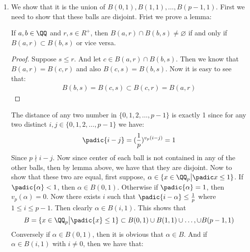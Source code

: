 \begin{enumerate}[label=\ilabel]
        \begin{gather*}
            x = p^r w = p^k p^{r - k} w
        \end{gather*}
        And since $p^{r - k} w \in \ZZ_p$, then $x \in p^k \ZZ_p$. This follows that $I \subseteq p^k \ZZ_p$. Hence $I = p^k \ZZ_p$. And we know that $p^k \ZZ_p$ is describing $B(0, (\frac{1}{p})^k) = \{ x \in \ZZ_p \big| \padic x < (\frac{1}{p})^k \}$. Hence the proof is complete.
    \item
        We show that it is the union of $B(0, 1), B(1, 1), \dots, B(p - 1, 1)$. First we need to show that these balls are disjoint. Frist we prove a lemma:
        \begin{lemma}
            If $a, b \in \QQ$ and $r, s \in R^+$, then $B(a, r) \cap B(b, s) \ne \varnothing$ if and only if $B(a, r) \subset B(b, s)$ or vice versa.
        \end{lemma}
        \begin{proof}
            Suppose $s \le r$. And let $c \in B(a, r) \cap B(b, s)$. Then we know that $B(a, r) = B(c, r)$ and also $B(c, s) = B(b, s)$. Now it is easy to see that:
            \begin{gather*}
                B(b, s) = B(c, s) \subset B(c, r) = B(a, r)
            \end{gather*}
        \end{proof}
        The distance of any two number in $\{0, 1, 2, \dots, p - 1\}$ is exactly 1 since for any two distinct $i, j \in \{0, 1, 2, \dots, p - 1 \}$ we have:
        \begin{gather*}
            \padic{i - j} = (\frac{1}{p})^{v_p(i - j)} = 1
        \end{gather*}
        Since $p \nmid i - j$. Now since center of each ball is not contained in any of the other balls, then by lemma above, we have that they are disjoint. Now to show that these two are equal, first suppose, $\alpha \in \{ x \in \QQ_p \big| \padic x \le 1 \}$.
        If $\padic{\alpha} < 1$, then $\alpha \in B(0, 1)$. Otherwise if $\padic{\alpha} = 1$, then $v_p(\alpha) = 0$. Now there exists $i$ such that $\padic{i - \alpha} \le \frac{1}{p}$ where $1 \le i \le p - 1$. Then clearly $\alpha \in B(i, 1)$. 
        This shows that
        \begin{gather*}
            B = \{x \in \QQ_p \big| \padic{x} \le 1 \} \subset B(0, 1) \cup B(1, 1) \cup \dots, \cup B(p - 1, 1) 
        \end{gather*}
        Conversely if $\alpha \in B(0, 1)$, then it is obvious that $\alpha \in B$. And if $\alpha \in B(i, 1)$ with $i \ne 0$, then we have that:

\end{enumerate}
